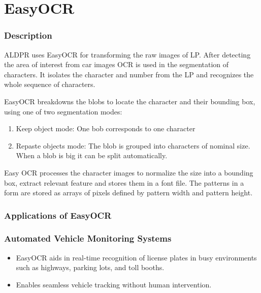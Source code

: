 %
%

\chapter{EasyOCR}


\subsection{Description}

ALDPR uses EasyOCR for transforming the raw images of LP. After detecting the area of interest from car images OCR is used in the segmentation of characters. It isolates the character and number from the LP and recognizes the whole sequence of characters.


EasyOCR breakdowns the blobs to locate the character and their bounding box, using one of two segmentation modes:
\begin{enumerate}
	\item Keep object mode: One bob corresponds to one character
	\item Repaste objects mode: The blob is grouped into characters of nominal size. When a blob is big it can be split automatically.
\end{enumerate}

Easy OCR processes the character images to normalize the size into a bounding box, extract relevant feature and stores them in a font file. The patterns in a form are stored as arrays of pixels defined by pattern width and pattern height.

\subsection{Applications of EasyOCR}

\subsection*{Automated Vehicle Monitoring Systems} 

\begin{itemize}
	\item EasyOCR aids in real-time recognition of license plates in busy environments such as highways, parking lots, and toll booths.
	\item Enables seamless vehicle tracking without human intervention.
\end{itemize}
